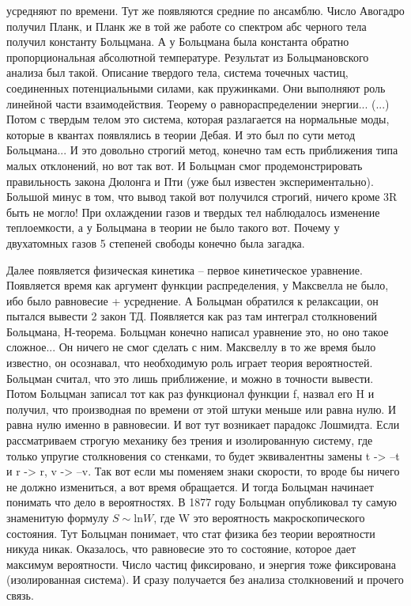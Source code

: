 \documentclass[a4paper, 12pt]{article}
\begin{document}
усредняют по времени. Тут же появляются средние по ансамблю. Число 
Авогадро получил Планк, и Планк же в той же работе со спектром абс 
черного тела получил константу Больцмана. А у Больцмана была константа 
обратно пропорциональная абсолютной температуре. Результат из 
Больцмановского анализа был такой. Описание твердого тела, система 
точечных частиц, соединенных потенциальными силами, как пружинками. Они 
выполняют роль линейной части взаимодействия. Теорему 
о равнораспределении энергии... (...) Потом с твердым телом это система, 
которая разлагается на нормальные моды, которые в квантах появлялись 
в теории Дебая. И это был по сути метод Больцмана... И это довольно 
строгий метод, конечно там есть приближения типа малых отклонений, но 
вот так вот. И Больцман смог продемонстрировать правильность закона 
Дюлонга и Пти (уже был известен экспериментально). Большой минус в том, 
что вывод такой вот получился строгий, ничего кроме 3R быть не могло! 
При охлаждении газов и твердых тел наблюдалось изменение теплоемкости, 
а у Больцмана в теории не было такого вот. Почему у двухатомных газов 
5 степеней свободы конечно была загадка.

Далее появляется физическая кинетика -- первое кинетическое уравнение. 
Появляется время как аргумент функции распределения, у Максвелла не 
было, ибо было равновесие + усреднение. А Больцман обратился 
к релаксации, он пытался вывести 2 закон ТД. Появляется как раз там 
интеграл столкновений Больцмана, Н-теорема. Больцман конечно написал 
уравнение это, но оно такое сложное... Он ничего не смог сделать с ним. 
Максвеллу в то же время было известно, он осознавал, что необходимую 
роль играет теория вероятностей. Больцман считал, что это лишь 
приближение, и можно в точности вывести. Потом Больцман записал тот как 
раз функционал функции f, назвал его H и получил, что производная по 
времени от этой штуки меньше или равна нулю. И равна нулю именно 
в равновесии. И вот тут возникает парадокс Лошмидта. Если рассматриваем 
строгую механику без трения и изолированную систему, где только упругие 
столкновения со стенками, то будет эквивалентны замены t -> --t и r -> 
r, v -> --v. Так вот если мы поменяем знаки скорости, то вроде бы ничего 
не должно измениться, а вот время обращается. И тогда Больцман начинает 
понимать что дело в вероятностях. В 1877 году Больцман опубликовал ту 
самую знаменитую формулу $S \sim \mathrm{ln} W$, где W это вероятность 
макроскопического состояния. Тут Больцман понимает, что стат физика без 
теории вероятности никуда никак. Оказалось, что равновесие это то 
состояние, которое дает максимум вероятности. Число частиц фиксировано, 
и энергия тоже фиксирована (изолированная система). И сразу получается 
без анализа столкновений и прочего связь.
\end{document}
